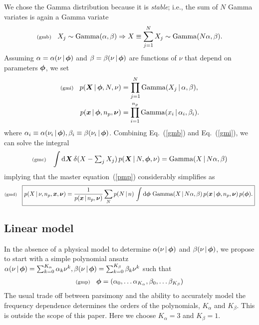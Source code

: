 \documentclass[11pt]{article}
\newcommand{\lleq}[1]{\label{#1} }
\renewcommand{\lleq}[1]{\label{#1} {\scriptstyle {\rm (#1)}} \hspace*{2ex} }
\newcommand{\cond}{\,|\,}
\newcommand{\refeq}[1]{Eq.~(\ref{#1})}
\DeclareMathOperator{\GammaDist}{Gamma}
\newcommand{\Kalpha}{{K_\alpha}}
\newcommand{\Kbeta}{{K_\beta}}
\newcommand{\npack}{n_p}
\newcommand{\rmdx}[1]{\mbox{d} #1 \,} %
\begin{document}
We chose the Gamma distribution because it is \emph{stable}; i.e.,
the sum of $N$ Gamma variates is again a Gamma variate
\begin{align}
  \lleq{gmb}
    X_j \sim \GammaDist(\alpha, \beta) \Rightarrow X \equiv \sum_{j=1}^N X_j \sim \GammaDist(N \alpha, \beta).
\end{align}
Assuming $\alpha = \alpha(\nu \cond \bmphi)$ and $\beta = \beta(\nu
\cond \bmphi)$ are functions of $\nu$ that depend on parameters
${\bm{\phi}}$, we set
\begin{align}
  \lleq{gmi}
  p(\bmX \cond \bmphi, N, \nu) &= \prod_{j=1}^N \GammaDist(X_j \cond \alpha, \beta ),\\
  p(\bmx \cond \bmphi, \npack, \bmnu) &= \prod_{i=1}^{\npack} \GammaDist(x_i \cond \alpha_i, \beta_i).
\end{align}
where $\alpha_i \equiv \alpha(\nu_i \cond \bmphi), \beta_i \equiv
\beta(\nu_i \cond \bmphi)$.  Combining \refeq{gmb} and \refeq{gmi}, we
can solve the integral
\begin{align}
  \lleq{gmc}
  \int \rmdx{\bmX} \delta(X - \textstyle\sum_j X_j)
  \,p(\bmX\cond N,\bmphi, \nu) = \GammaDist(X \cond N \alpha, \beta)
\end{align}
implying that the master equation~(\ref{pmp}) considerably simplifies
as
\begin{align}
  \lleq{gmd}
    \boxed{
    p(X\cond \nu, \npack,\bmx,\bmnu)
  = \frac{1}{p(\bmx\cond \npack, \bmnu)}
  \sum_N p(N\cond n)\, \int \rmdx{\bmphi} \GammaDist(X \cond N \alpha, \beta) %
  \, p(\bmx\cond \bmphi, \npack, \bmnu)
  \, p(\bmphi).
  }
\end{align}

\subsection{Linear model}

In the absence of a physical model to determine $\alpha(\nu \cond
\bmphi)$ and $\beta(\nu \cond \bmphi)$, we propose to start with a simple polynomial ansatz   $\alpha(\nu \cond \bmphi) = \sum_{k=0}^\Kalpha \alpha_k \nu^k, \beta(\nu \cond \bmphi) = \sum_{k=0}^\Kbeta \beta_k \nu^k$ such that
\begin{align}
  \lleq{gmp}
  \bmphi = (\alpha_0, \dots \alpha_\Kalpha , \beta_0, \dots \beta_\Kbeta)
\end{align}
The usual trade off between parsimony and the ability to accurately
model the frequency dependence determines the orders of the
polynomials, $\Kalpha$ and $\Kbeta$. This is outside the scope of this
paper. Here we choose $\Kalpha = 3$ and $\Kbeta = 1$.
\end{document}
